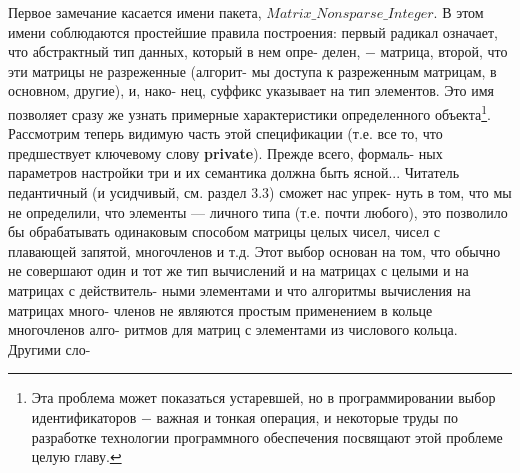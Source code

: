 Первое замечание касается имени пакета, $Matrix\_Nonsparse\_Integer$.\linebreak
В  этом  имени  соблюдаются  простейшие  правила  построения:  первый\linebreak
радикал означает,  что  абстрактный  тип  данных,  который в  нем  опре-\linebreak
делен, $-$ матрица, второй, что эти матрицы не разреженные  (алгорит-\linebreak
мы  доступа  к  разреженным  матрицам,  в  основном,  другие),  и,  нако-\linebreak
нец, суффикс указывает на тип элементов. Это имя позволяет сразу же\linebreak
узнать примерные характеристики  определенного объекта\footnote{
Эта  проблема  может  показаться  устаревшей,  но  в  программировании  выбор\linebreak
идентификаторов $-$ важная и  тонкая операция, и  некоторые труды по  разработке\linebreak
технологии программного обеспечения посвящают этой проблеме целую  главу.}.\newline
Рассмотрим теперь видимую часть этой спецификации  (т.е.  все то,\linebreak
что предшествует  ключевому слову \textbf{private}). Прежде  всего,  формаль-\linebreak
\noindent
ных параметров  настройки  три  и  их  семантика  должна  быть ясной...\linebreak
Читатель педантичный  (и усидчивый, см. раздел 3.3) сможет нас упрек­-\linebreak
нуть  в  том,  что мы  не  определили,  что элементы  — личного типа  (т.е.\linebreak
почти  любого),  это  позволило  бы  обрабатывать одинаковым  способом\linebreak
матрицы  целых  чисел,  чисел  с  плавающей  запятой,  многочленов и  т.д.\linebreak
Этот выбор  основан  на  том,  что  обычно  не  совершают  один  и  тот же\linebreak
тип  вычислений  и  на матрицах с целыми  и  на  матрицах с  действитель­-\linebreak
ными  элементами  и  что  алгоритмы  вычисления  на  матрицах  много­-\linebreak
членов  не являются  простым  применением  в  кольце  многочленов  алго­-\linebreak
ритмов  для  матриц  с  элементами  из  числового  кольца.  Другими  сло­-\linebreak
